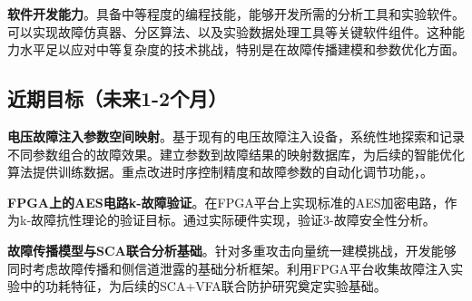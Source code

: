 \documentclass{article}
\begin{document}
\textbf{软件开发能力}。具备中等程度的编程技能，能够开发所需的分析工具和实验软件。可以实现故障仿真器、分区算法、以及实验数据处理工具等关键软件组件。这种能力水平足以应对中等复杂度的技术挑战，特别是在故障传播建模和参数优化方面。


\subsection{近期目标（未来1-2个月）}

\textbf{电压故障注入参数空间映射}。基于现有的电压故障注入设备，系统性地探索和记录不同参数组合的故障效果。建立参数到故障结果的映射数据库，为后续的智能优化算法提供训练数据。重点改进时序控制精度和故障参数的自动化调节功能，。

\textbf{FPGA上的AES电路k-故障验证}。在FPGA平台上实现标准的AES加密电路，作为k-故障抗性理论的验证目标。通过实际硬件实现，验证3-故障安全性分析。

\textbf{故障传播模型与SCA联合分析基础}。针对多重攻击向量统一建模挑战，开发能够同时考虑故障传播和侧信道泄露的基础分析框架。利用FPGA平台收集故障注入实验中的功耗特征，为后续的SCA+VFA联合防护研究奠定实验基础。

\end{document}

